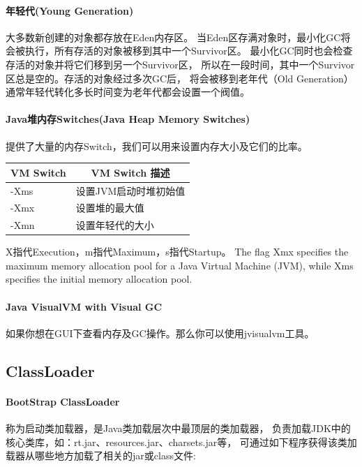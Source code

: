 \documentclass{book}
\begin{document}
\paragraph{年轻代(Young Generation)}

大多数新创建的对象都存放在Eden内存区。
当Eden区存满对象时，最小化GC将会被执行，所有存活的对象被移到其中一个Survivor区。
最小化GC同时也会检查存活的对象并将它们移到另一个Survivor区，
所以在一段时间，其中一个Survivor区总是空的。存活的对象经过多次GC后，
将会被移到老年代（Old Generation）通常年轻代转化多长时间变为老年代都会设置一个阀值。

\paragraph{Java堆内存Switches(Java Heap Memory Switches)}

提供了大量的内存Switch，我们可以用来设置内存大小及它们的比率。

\begin{tabular}{l|p{10cm}}
	\multirow{1}{*}{VM Switch}			
	& \multicolumn{1}{c}{VM Switch 描述}\\	 
	\hline
	-Xms & 设置JVM启动时堆初始值\\
	\hline
	-Xmx & 设置堆的最大值\\
	\hline
	-Xmn & 设置年轻代的大小\\
	\hline	
\end{tabular}

X指代Execution，m指代Maximum，s指代Startup。
The flag Xmx specifies the maximum memory allocation pool for a Java Virtual Machine (JVM), while Xms specifies the initial memory allocation pool.

\paragraph{Java VisualVM with Visual GC}

如果你想在GUI下查看内存及GC操作。那么你可以使用jvisualvm工具。

\subsection{ClassLoader}

\paragraph{BootStrap ClassLoader}

称为启动类加载器，是Java类加载层次中最顶层的类加载器，
负责加载JDK中的核心类库，如：rt.jar、resources.jar、charsets.jar等，
可通过如下程序获得该类加载器从哪些地方加载了相关的jar或class文件:
\end{document}
